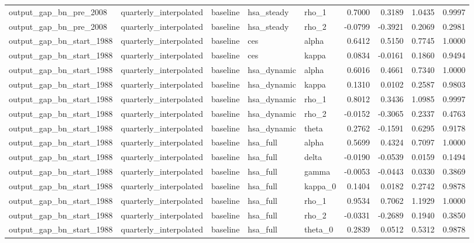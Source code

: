 \begin{tabular}{lllllrrrr}
output\_gap\_bn\_pre\_2008 & quarterly\_interpolated & baseline & hsa\_steady & rho\_1 & 0.7000 & 0.3189 & 1.0435 & 0.9997 \\
output\_gap\_bn\_pre\_2008 & quarterly\_interpolated & baseline & hsa\_steady & rho\_2 & -0.0799 & -0.3921 & 0.2069 & 0.2981 \\
output\_gap\_bn\_start\_1988 & quarterly\_interpolated & baseline & ces & alpha & 0.6412 & 0.5150 & 0.7745 & 1.0000 \\
output\_gap\_bn\_start\_1988 & quarterly\_interpolated & baseline & ces & kappa & 0.0834 & -0.0161 & 0.1860 & 0.9494 \\
output\_gap\_bn\_start\_1988 & quarterly\_interpolated & baseline & hsa\_dynamic & alpha & 0.6016 & 0.4661 & 0.7340 & 1.0000 \\
output\_gap\_bn\_start\_1988 & quarterly\_interpolated & baseline & hsa\_dynamic & kappa & 0.1310 & 0.0102 & 0.2587 & 0.9803 \\
output\_gap\_bn\_start\_1988 & quarterly\_interpolated & baseline & hsa\_dynamic & rho\_1 & 0.8012 & 0.3436 & 1.0985 & 0.9997 \\
output\_gap\_bn\_start\_1988 & quarterly\_interpolated & baseline & hsa\_dynamic & rho\_2 & -0.0152 & -0.3065 & 0.2337 & 0.4763 \\
output\_gap\_bn\_start\_1988 & quarterly\_interpolated & baseline & hsa\_dynamic & theta & 0.2762 & -0.1591 & 0.6295 & 0.9178 \\
output\_gap\_bn\_start\_1988 & quarterly\_interpolated & baseline & hsa\_full & alpha & 0.5699 & 0.4324 & 0.7097 & 1.0000 \\
output\_gap\_bn\_start\_1988 & quarterly\_interpolated & baseline & hsa\_full & delta & -0.0190 & -0.0539 & 0.0159 & 0.1494 \\
output\_gap\_bn\_start\_1988 & quarterly\_interpolated & baseline & hsa\_full & gamma & -0.0053 & -0.0443 & 0.0330 & 0.3869 \\
output\_gap\_bn\_start\_1988 & quarterly\_interpolated & baseline & hsa\_full & kappa\_0 & 0.1404 & 0.0182 & 0.2742 & 0.9878 \\
output\_gap\_bn\_start\_1988 & quarterly\_interpolated & baseline & hsa\_full & rho\_1 & 0.9534 & 0.7062 & 1.1929 & 1.0000 \\
output\_gap\_bn\_start\_1988 & quarterly\_interpolated & baseline & hsa\_full & rho\_2 & -0.0331 & -0.2689 & 0.1940 & 0.3850 \\
output\_gap\_bn\_start\_1988 & quarterly\_interpolated & baseline & hsa\_full & theta\_0 & 0.2839 & 0.0512 & 0.5312 & 0.9878 \\

\end{tabular}
